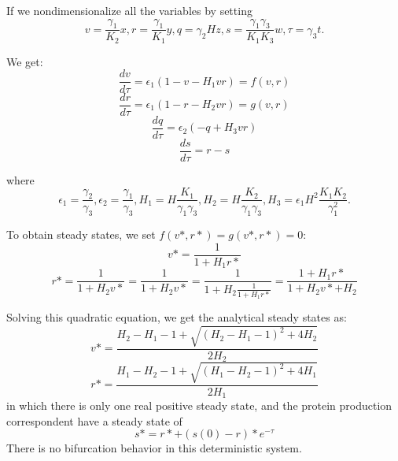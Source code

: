 \documentclass[fleqn,10pt]{wlscirep}
\begin{document}
If we nondimensionalize all the variables by setting
\begin{equation}
v = \frac{\gamma_1}{K_2}x,   
r = \frac{\gamma_1}{K_1}y,  
q = \gamma_2Hz,  
s = \frac{\gamma_1\gamma_3}{K_1K_3}w,  
\tau = \gamma_3t.
\end{equation}

We get:
\begin{equation}
\frac{dv}{d\tau} = \epsilon_1 (1 - v - H_1vr) = f(v, r)
\end{equation}
\begin{equation}
\frac{dr}{d\tau} = \epsilon_1 (1 - r - H_2vr) = g(v, r)
\end{equation}
\begin{equation}
\frac{dq}{d\tau} = \epsilon_2 (- q + H_3vr)
\end{equation}
\begin{equation}
\frac{ds}{d\tau} = r - s
\end{equation}

where 
\begin{equation}
\epsilon_1 = \frac{\gamma_2}{\gamma_3}, 
\epsilon_2 = \frac{\gamma_1}{\gamma_3}, 
H_1 = H\frac{K_1}{\gamma_1\gamma_3}, 
H_2 = H\frac{K_2}{\gamma_1\gamma_3}, 
H_3 = \epsilon_1H^2\frac{K_1K_2}{\gamma_1^2}.
\end{equation}

To obtain steady states, we set $f(v*, r*) = g(v*, r*) = 0$:
\begin{equation}
v* = \frac{1}{1 + H_1r*}
\end{equation}
\begin{equation}
r* = \frac{1}{1 + H_2v*} = \frac{1}{1 + H_2v*} = \frac{1}{1 + H_2\frac{1}{1 + H_1r*}} = \frac{1 + H_1r*}{1 + H_2v* + H_2} 
\end{equation}

Solving this quadratic equation, we get the analytical steady states as:
\begin{equation}
v* = \frac{H_2 - H_1 - 1 + \sqrt{(H_2 - H_1 - 1)^2 + 4H_2}}{2H_2}
\end{equation}
\begin{equation}
r* = \frac{H_1 - H_2 - 1 + \sqrt{(H_1 - H_2 - 1)^2 + 4H_1}}{2H_1}
\end{equation}
in which there is only one real positive steady state, and the protein production correspondent have a steady state of \begin{equation}
s* = r* + (s(0) - r)*e^{-\tau}
\end{equation}
There is no bifurcation behavior in this deterministic system.
\end{document}
